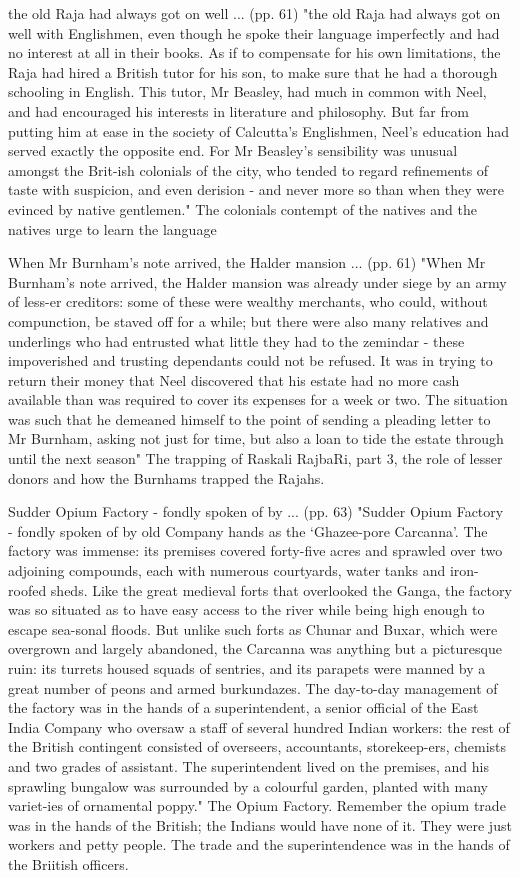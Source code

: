 the old Raja had always got on well ... (pp. 61)
"the old Raja had always got on well with Englishmen, even though he spoke their language imperfectly and had no interest at all in their books. As if to compensate for his own limitations, the Raja had hired a British tutor for his son, to make sure that he had a thorough schooling in English. This tutor, Mr Beasley, had much in common with Neel, and had encouraged his interests in literature and philosophy. But far from putting him at ease in the society of Calcutta’s Englishmen, Neel’s education had served exactly the opposite end. For Mr Beasley’s sensibility was unusual amongst the Brit-ish colonials of the city, who tended to regard refinements of taste with suspicion, and even derision - and never more so than when they were evinced by native gentlemen."
The colonials contempt of the natives and the natives urge to learn the language

When Mr Burnham’s note arrived, the Halder mansion ... (pp. 61)
"When Mr Burnham’s note arrived, the Halder mansion was already under siege by an army of less-er creditors: some of these were wealthy merchants, who could, without compunction, be staved off for a while; but there were also many relatives and underlings who had entrusted what little they had to the zemindar - these impoverished and trusting dependants could not be refused. It was in trying to return their money that Neel discovered that his estate had no more cash available than was required to cover its expenses for a week or two. The situation was such that he demeaned himself to the point of sending a pleading letter to Mr Burnham, asking not just for time, but also a loan to tide the estate through until the next season"
The trapping of Raskali RajbaRi, part 3, the role of lesser donors and how the Burnhams trapped the Rajahs.

Sudder Opium Factory - fondly spoken of by ... (pp. 63)
"Sudder Opium Factory - fondly spoken of by old Company hands as the ‘Ghazee-pore Carcanna’. The factory was immense: its premises covered forty-five acres and sprawled over two adjoining compounds, each with numerous courtyards, water tanks and iron-roofed sheds. Like the great medieval forts that overlooked the Ganga, the factory was so situated as to have easy access to the river while being high enough to escape sea-sonal floods. But unlike such forts as Chunar and Buxar, which were overgrown and largely abandoned, the Carcanna was anything but a picturesque ruin: its turrets housed squads of sentries, and its parapets were manned by a great number of peons and armed burkundazes. The day-to-day management of the factory was in the hands of a superintendent, a senior official of the East India Company who oversaw a staff of several hundred Indian workers: the rest of the British contingent consisted of overseers, accountants, storekeep-ers, chemists and two grades of assistant. The superintendent lived on the premises, and his sprawling bungalow was surrounded by a colourful garden, planted with many variet-ies of ornamental poppy."
The Opium Factory. Remember the opium trade was in the hands of the British; the Indians would have none of it. They were just workers and petty people. The trade and the superintendence was in the hands of the Briitish officers.

